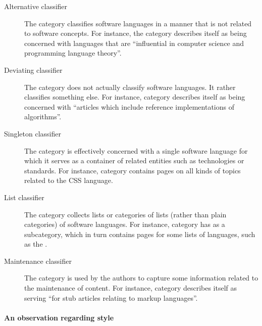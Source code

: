 {\small

\begin{description}

\item[Alternative classifier] The category classifies software languages in a manner that is not related to software concepts. For instance, the category  describes itself as being concerned with languages that are ``influential in computer science and programming language theory''.

\item[Deviating classifier] The category does not actually classify software languages. It rather classifies something else. For instance, category  describes itself as being concerned with ``articles which include reference implementations of algorithms''.

\item[Singleton classifier] The category is effectively concerned with a single software language for which it serves as a container of related entities such as technologies or standards. For instance, category  contains pages on all kinds of topics related to the CSS language.

\item[List classifier] The category collects lists or categories of lists (rather than plain categories) of software languages. For instance, category  has  as a subcategory, which in turn contains pages for some lists of languages, such as the .

\item[Maintenance classifier] The category is used by the \Wikipedia{} authors to capture some information related to the maintenance of content. For instance, category  describes itself as serving ``for stub articles relating to markup languages''.

\end{description}

}


\paragraph*{\textbf{An observation regarding \Wikipedia{} style}}

